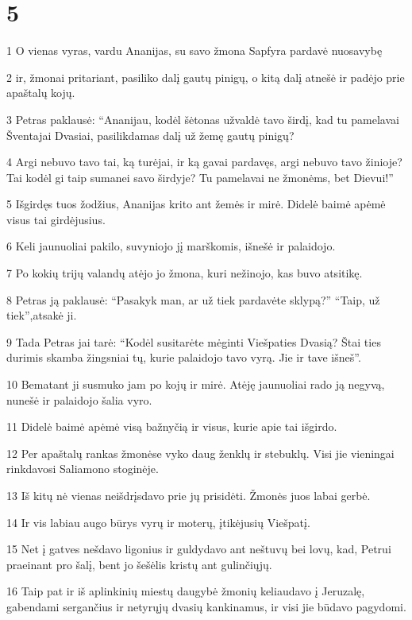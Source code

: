 \chapter{5}


\par 1 O vienas vyras, vardu Ananijas, su savo žmona Sapfyra pardavė nuosavybę 
\par 2 ir, žmonai pritariant, pasiliko dalį gautų pinigų, o kitą dalį atnešė ir padėjo prie apaštalų kojų. 
\par 3 Petras paklausė: “Ananijau, kodėl šėtonas užvaldė tavo širdį, kad tu pamelavai Šventajai Dvasiai, pasilikdamas dalį už žemę gautų pinigų? 
\par 4 Argi nebuvo tavo tai, ką turėjai, ir ką gavai pardavęs, argi nebuvo tavo žinioje? Tai kodėl gi taip sumanei savo širdyje? Tu pamelavai ne žmonėms, bet Dievui!” 
\par 5 Išgirdęs tuos žodžius, Ananijas krito ant žemės ir mirė. Didelė baimė apėmė visus tai girdėjusius. 
\par 6 Keli jaunuoliai pakilo, suvyniojo jį marškomis, išnešė ir palaidojo. 
\par 7 Po kokių trijų valandų atėjo jo žmona, kuri nežinojo, kas buvo atsitikę. 
\par 8 Petras ją paklausė: “Pasakyk man, ar už tiek pardavėte sklypą?” “Taip, už tiek”,­atsakė ji. 
\par 9 Tada Petras jai tarė: “Kodėl susitarėte mėginti Viešpaties Dvasią? Štai ties durimis skamba žingsniai tų, kurie palaidojo tavo vyrą. Jie ir tave išneš”. 
\par 10 Bematant ji susmuko jam po kojų ir mirė. Atėję jaunuoliai rado ją negyvą, nunešė ir palaidojo šalia vyro. 
\par 11 Didelė baimė apėmė visą bažnyčią ir visus, kurie apie tai išgirdo. 
\par 12 Per apaštalų rankas žmonėse vyko daug ženklų ir stebuklų. Visi jie vieningai rinkdavosi Saliamono stoginėje. 
\par 13 Iš kitų nė vienas neišdrįsdavo prie jų prisidėti. Žmonės juos labai gerbė. 
\par 14 Ir vis labiau augo būrys vyrų ir moterų, įtikėjusių Viešpatį. 
\par 15 Net į gatves nešdavo ligonius ir guldydavo ant neštuvų bei lovų, kad, Petrui praeinant pro šalį, bent jo šešėlis kristų ant gulinčiųjų. 
\par 16 Taip pat ir iš aplinkinių miestų daugybė žmonių keliaudavo į Jeruzalę, gabendami sergančius ir netyrųjų dvasių kankinamus, ir visi jie būdavo pagydomi. 

